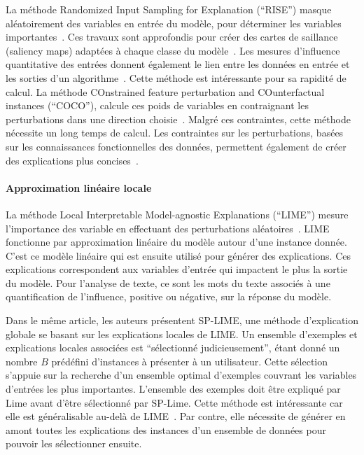 La méthode Randomized Input Sampling for Explanation (``RISE'') masque aléatoirement des variables en entrée du modèle, pour déterminer les variables importantes~\cite{Petsiuk2018}.
Ces travaux sont approfondis pour créer des cartes de saillance (saliency maps) adaptées à chaque classe du modèle~\cite{Thakur2021}.
Les mesures d'influence quantitative des entrées donnent également le lien entre les données en entrée et les sorties d'un algorithme~\cite{Datta2016}. Cette méthode est intéressante pour sa rapidité de calcul.
La méthode COnstrained feature perturbation and COunterfactual instances (``COCO''), calcule ces poids de variables en contraignant les perturbations dans une direction choisie~\cite{Fang2021}. Malgré ces contraintes, cette méthode nécessite un long temps de calcul. Les contraintes sur les perturbations, basées sur les connaissances fonctionnelles des données, permettent également de créer des explications plus concises~\cite{Gorji2022}.


\paragraph{Approximation linéaire locale}
La méthode Local Interpretable Model-agnostic Explanations (``LIME'') mesure l'importance des variable en effectuant des perturbations aléatoires~\cite{Ribeiro2016}. LIME fonctionne par approximation linéaire du modèle autour d'une instance donnée. C'est ce modèle linéaire qui est ensuite utilisé pour générer des explications. Ces explications correspondent aux variables d'entrée qui impactent le plus la sortie du modèle. Pour l'analyse de texte, ce sont les mots du texte associés à une quantification de l'influence, positive ou négative, sur la réponse du modèle.

Dans le même article, les auteurs présentent SP-LIME, une méthode d'explication globale se basant sur les explications locales de LIME. Un ensemble d'exemples et explications locales associées est ``sélectionné judicieusement''\cite{Ribeiro2016}, étant donné un nombre $B$ prédéfini d'instances à présenter à un utilisateur.
Cette sélection s'appuie sur la recherche d'un ensemble optimal d'exemples couvrant les variables d'entrées les plus importantes. L'ensemble des exemples doit être expliqué par Lime avant d'être sélectionné par SP-Lime.
Cette méthode est intéressante car elle est généralisable au-delà de LIME~\cite{Ribeiro2018}. Par contre, elle nécessite de générer en amont toutes les explications des instances d'un ensemble de données pour pouvoir les sélectionner ensuite.

